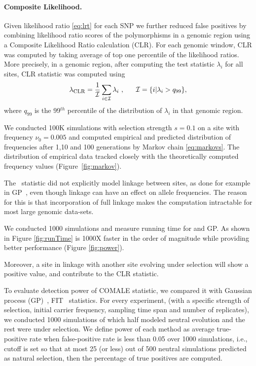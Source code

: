 \documentclass[11pt]{article}
\def\comale{\text{COMALE }}
\begin{document}
\paragraph{Composite Likelihood.}
Given likelihood ratio \eqref{eq:lrt} for each
SNP we further reduced false positives by combining likelihood ratio
scores of the polymorphisms in a genomic region using a Composite
Likelihood Ratio calculation
(CLR)\cite{nielsen2005genomic,williamson2007localizing,vitti2013detecting}.
For each genomic window, CLR was computed by taking average of top one
percentile of the likelihood ratios.  More precisely, in a genomic
region, after computing the test statistic ${\lambda_i}$ for all
sites, \comale CLR statistic was computed using
\begin{equation}
 \lambda_{\mbox{{\sc clr}}} = \frac{1}{{\cal I}}\sum_{i \in
  {\cal I}} \lambda_i \ ,\ \ \ \ \ {\cal I}=\{i | \lambda_i > q_{99}\},  
  \label{eq:comale}
\end{equation}
where $q_{99}$ is the 99$^{th}$ percentile of the distribution of
${\lambda_i}$ in that genomic region.

We conducted 100K simulations with selection strength $s=0.1$ on a
site with frequency $\nu_0=0.005$ and computed empirical and predicted
distribution of frequencies after 1,10 and 100 generations by Markov
chain \eqref{eq:markovs}. The distribution of empirical data tracked
closely with the theoretically computed frequency values
(Figure~\ref{fig:markov}).


The \comale\ statistic did not explicitly model linkage between sites,
as done for example in GP~\cite{Terhorst2015Multi}, even though linkage can have an
effect on allele frequencies. The reason for this is that
incorporation of full linkage makes the computation intractable for
most large genomic data-sets. 

We conducted 1000 simulations and measure running time for \comale and GP. As shown in Figure \ref{fig:runTime}
 \comale is 1000X faster  in the order of magnitude while providing better performance (Figure \ref{fig:power}).

Moreover, a site in linkage with another
site evolving under selection will show a positive value, and
contribute to the CLR statistic.

To evaluate detection power of COMALE statistic, we compared it with
Gaussian process (GP)~\cite{Terhorst2015Multi},
FIT~\cite{feder2014Identifying} statistics.  For every experiment,
(with a specific strength of selection, initial carrier frequency,
sampling time span and number of replicates), we conducted 1000
simulations of which half modeled neutral evolution and the rest were
under selection. We define power of each method as average
true-positive rate when false-positive rate is less than 0.05 over
1000 simulations, i.e.,  cutoff is set so that at most 25 (or less) out of 500 neutral simulations predicted as natural selection, then the percentage of true positives are computed.
\end{document}
